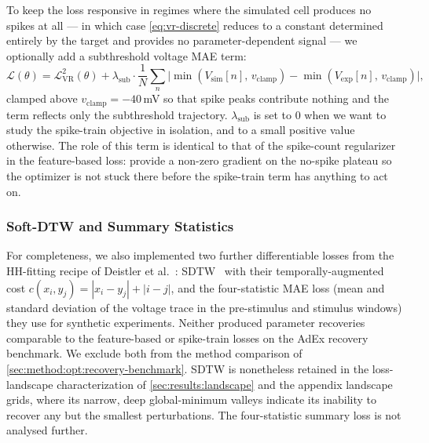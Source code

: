 To keep the loss responsive in regimes where the simulated cell produces no spikes at all --- in which case \cref{eq:vr-discrete} reduces to a constant determined entirely by the target and provides no parameter-dependent signal --- we optionally add a subthreshold voltage \gls{MAE} term:
\begin{equation}\label{eq:vr-sub}
    \mathcal{L}(\theta) = \mathcal{L}_{\mathrm{VR}}^{2}(\theta) + \lambda_{\mathrm{sub}} \cdot \frac{1}{N}\sum_{n} \bigl| \min(V_{\mathrm{sim}}[n],\,v_{\mathrm{clamp}}) - \min(V_{\mathrm{exp}}[n],\,v_{\mathrm{clamp}}) \bigr|,
\end{equation}
clamped above $v_{\mathrm{clamp}} = -40$\,mV so that spike peaks contribute nothing and the term reflects only the subthreshold trajectory.
$\lambda_{\mathrm{sub}}$ is set to $0$ when we want to study the spike-train objective in isolation, and to a small positive value otherwise.
The role of this term is identical to that of the spike-count regularizer in the feature-based loss: provide a non-zero gradient on the no-spike plateau so the optimizer is not stuck there before the spike-train term has anything to act on.

\subsubsection{Soft-DTW and Summary Statistics}\label{sec:method:opt:loss:misc}
For completeness, we also implemented two further differentiable losses from the \gls{HH}-fitting recipe of Deistler et al.~\cite{Deistler2025}:
\gls{SDTW}~\cite{Blondel2018} with their temporally-augmented cost $c(x_i, y_j) = |x_i - y_j| + |i - j|$, and the four-statistic \gls{MAE} loss (mean and standard deviation of the voltage trace in the pre-stimulus and stimulus windows) they use for synthetic experiments.
Neither produced parameter recoveries comparable to the feature-based or spike-train losses on the \gls{AdEx} recovery benchmark.
We exclude both from the method comparison of \cref{sec:method:opt:recovery-benchmark}.
\gls{SDTW} is nonetheless retained in the loss-landscape characterization of \cref{sec:results:landscape} and the appendix landscape grids, where its narrow, deep global-minimum valleys indicate its inability to recover any but the smallest perturbations.
The four-statistic summary loss is not analysed further.


